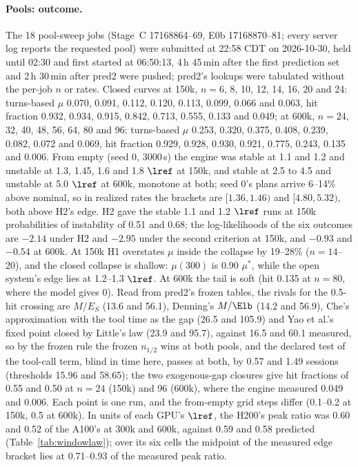 \paragraph{Pools: outcome.} The 18 pool-sweep jobs (Stage~C 17168864--69, E0b 17168870--81; every server log reports the requested pool) were submitted at 22:58 CDT on 2026-10-30, held until 02:30 and first started at 06:50:13, 4\,h 45\,min after the first prediction set and 2\,h 30\,min after pred2 were pushed; pred2's lookups were tabulated without the per-job $n$ or rates. Closed curves at 150k, $n=6$, 8, 10, 12, 14, 16, 20 and 24: turns-based $\mu$ 0.070, 0.091, 0.112, 0.120, 0.113, 0.099, 0.066 and 0.063\sps{}, hit fraction 0.932, 0.934, 0.915, 0.842, 0.713, 0.555, 0.133 and 0.049; at 600k, $n=24$, 32, 40, 48, 56, 64, 80 and 96: turns-based $\mu$ 0.253, 0.320, 0.375, 0.408, 0.239, 0.082, 0.072 and 0.069\sps{}, hit fraction 0.929, 0.928, 0.930, 0.921, 0.775, 0.243, 0.135 and 0.006. From empty (seed 0, 3000\,s) the engine was stable at 1.1 and 1.2 and unstable at 1.3, 1.45, 1.6 and 1.8 $\lref$ at 150k, and stable at 2.5 to 4.5 and unstable at 5.0 $\lref$ at 600k, monotone at both; seed 0's plans arrive 6--14\% above nominal, so in realized rates the brackets are $[1.36,1.46)$ and $[4.80,5.32)$, both above H2's edge. H2 gave the stable 1.1 and 1.2 $\lref$ runs at 150k probabilities of instability of 0.51 and 0.68; the log-likelihoods of the six outcomes are $-2.14$ under H2 and $-2.95$ under the second criterion at 150k, and $-0.93$ and $-0.54$ at 600k. At 150k H1 overstates $\mu$ inside the collapse by 19--28\% ($n=14$--20), and the closed collapse is shallow: $\mu(300)$ is 0.90 $\mu^*$, while the open system's edge lies at 1.2--1.3 $\lref$. At 600k the tail is soft (hit 0.135 at $n=80$, where the model gives 0). Read from pred2's frozen tables, the rivals for the 0.5-hit crossing are $M/E_S$ (13.6 and 56.1), Denning's $M/\Elb$ (14.2 and 56.9), Che's approximation with the tool time as the gap (26.5 and 105.9) and Yao et al.'s fixed point closed by Little's law (23.9 and 95.7), against 16.5 and 60.1 measured, so by the frozen rule the frozen $n_{1/2}$ wins at both pools, and the declared test of the tool-call term, blind in time here, passes at both, by 0.57 and 1.49 sessions (thresholds 15.96 and 58.65); the two exogenous-gap closures give hit fractions of 0.55 and 0.50 at $n=24$ (150k) and 96 (600k), where the engine measured 0.049 and 0.006. Each point is one run, and the from-empty grid steps differ (0.1--0.2 at 150k, 0.5 at 600k). In units of each GPU's $\lref$, the H200's peak ratio was 0.60 and 0.52 of the A100's at 300k and 600k, against 0.59 and 0.58 predicted (Table~\ref{tab:windowlaw}); over its six cells the midpoint of the measured edge bracket lies at 0.71--0.93 of the measured peak ratio.

